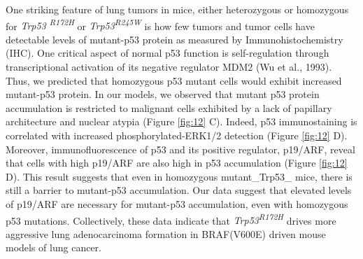 One striking feature of lung tumors in mice, either heterozygous or homozygous for \emph{Trp53 \textsuperscript{R172H}} or \emph{Trp53\textsuperscript{R245W}} is how few tumors and tumor cells have detectable levels of mutant-p53 protein as measured by Immunohistochemistry (IHC). One critical aspect of normal p53 function is self-regulation through transcriptional activation of its negative regulator MDM2 (Wu et al., 1993). Thus, we predicted that homozygous p53 mutant cells would exhibit increased mutant-p53 protein. In our models, we observed that mutant p53 protein accumulation is restricted to malignant cells exhibited by a lack of papillary architecture and nuclear atypia (Figure \ref{fig:12} C). Indeed, p53 immunostaining is correlated with increased phosphorylated-ERK1/2 detection (Figure \ref{fig:12} D).
Moreover, immunofluorescence of p53 and its positive regulator, p19/ARF, reveal that cells with high p19/ARF are also high in p53 accumulation (Figure \ref{fig:12} D). This result suggests that even in homozygous mutant\_Trp53\_ mice, there is still a barrier to mutant-p53 accumulation. Our data suggest that elevated levels of p19/ARF are necessary for mutant-p53 accumulation, even with homozygous p53 mutations. Collectively, these data indicate that \emph{Trp53\textsuperscript{R172H}} drives more aggressive lung adenocarcinoma formation in BRAF(V600E) driven mouse models of lung cancer.

